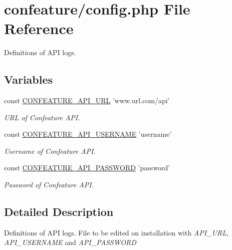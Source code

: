 \hypertarget{config_8php}{\section{confeature/config.php File Reference}
\label{config_8php}
}


Definitions of A\-P\-I logs.  


\subsection*{Variables}
\begin{DoxyCompactItemize}
\item 
const \hyperlink{config_8php_afbb16ca52762e87195663d3710de52cc}{C\-O\-N\-F\-E\-A\-T\-U\-R\-E\-\_\-\-A\-P\-I\-\_\-\-U\-R\-L} 'www.\-url.\-com/api'
\begin{DoxyCompactList}\small\item\em U\-R\-L of Confeature A\-P\-I. \end{DoxyCompactList}\item 
const \hyperlink{config_8php_a55bed016da931f1b594652961ba39156}{C\-O\-N\-F\-E\-A\-T\-U\-R\-E\-\_\-\-A\-P\-I\-\_\-\-U\-S\-E\-R\-N\-A\-M\-E} 'username'
\begin{DoxyCompactList}\small\item\em Username of Confeature A\-P\-I. \end{DoxyCompactList}\item 
const \hyperlink{config_8php_aabf368f92feaf5867e6ff1fabff50ac4}{C\-O\-N\-F\-E\-A\-T\-U\-R\-E\-\_\-\-A\-P\-I\-\_\-\-P\-A\-S\-S\-W\-O\-R\-D} 'password'
\begin{DoxyCompactList}\small\item\em Password of Confeature A\-P\-I. \end{DoxyCompactList}\end{DoxyCompactItemize}


\subsection{Detailed Description}
Definitions of A\-P\-I logs. File to be edited on installation with {\itshape A\-P\-I\-\_\-\-U\-R\-L}, {\itshape A\-P\-I\-\_\-\-U\-S\-E\-R\-N\-A\-M\-E} and {\itshape A\-P\-I\-\_\-\-P\-A\-S\-S\-W\-O\-R\-D} 

